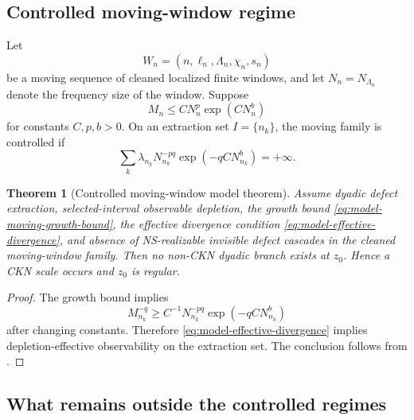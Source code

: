 \documentclass[11pt]{article}
\numberwithin{equation}{section}
\theoremstyle{plain}
\newtheorem{theorem}{Theorem}[section]
\theoremstyle{definition}
\theoremstyle{remark}
\begin{document}
\subsection{Controlled moving-window regime}

Let
\[
        W_n=(n,\ell_n,\Lambda_n,\chi_n,s_n)
\]
be a moving sequence of cleaned localized finite windows, and let
\(N_n=N_{\Lambda_n}\) denote the frequency size of the window.  Suppose
\begin{equation}
        M_n\le C N_n^p\exp(CN_n^b)
        \label{eq:model-moving-growth-bound}
\end{equation}
for constants \(C,p,b>0\).  On an extraction set \(I=\{n_k\}\), the moving
family is controlled if
\begin{equation}
        \sum_k \lambda_{n_k}N_{n_k}^{-pq}\exp(-qC N_{n_k}^b)=+\infty.
        \label{eq:model-effective-divergence}
\end{equation}

\begin{theorem}[Controlled moving-window model theorem]
\label{thm:controlled-moving-window-model}
Assume dyadic defect extraction, selected-interval observable depletion, the
growth bound \eqref{eq:model-moving-growth-bound}, the effective divergence
condition \eqref{eq:model-effective-divergence}, and absence of
NS-realizable invisible defect cascades in the cleaned moving-window family.
Then no non-CKN dyadic branch exists at \(z_0\).  Hence a CKN scale occurs and
\(z_0\) is regular.
\end{theorem}

\begin{proof}
The growth bound implies
\[
        M_{n_k}^{-q}
        \ge
        C^{-1}N_{n_k}^{-pq}\exp(-qC N_{n_k}^b)
\]
after changing constants.  Therefore \eqref{eq:model-effective-divergence}
implies depletion-effective observability on the extraction set.  The conclusion
follows from .
\end{proof}

\subsection{What remains outside the controlled regimes}
\end{document}

